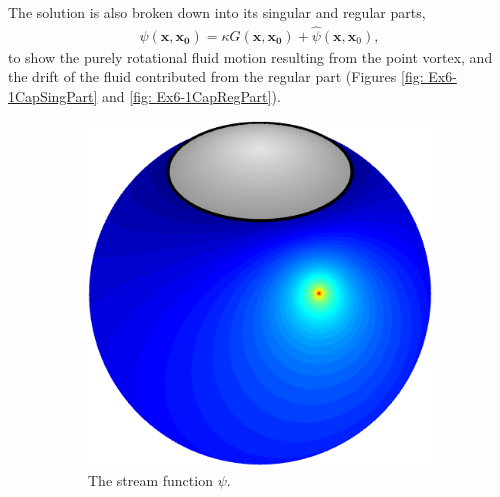 \documentclass{sfuthesis}
\begin{document}
The solution is also broken down into its singular and regular parts,
\begin{align*}
	\psi(\mathbf{x},\mathbf{x_0})=\kappa G(\mathbf{x},\mathbf{x_0})+\hat{\psi}(\mathbf{x}, \mathbf{x}_0), 
\end{align*}
to show the purely rotational fluid motion resulting from the point vortex, and the drift of the fluid contributed from the regular part (Figures \ref{fig: Ex6-1CapSingPart} and \ref{fig: Ex6-1CapRegPart}).

\begin{figure}[h]
        \centering
        \begin{subfigure}[b]{0.35\textwidth}
        		\includegraphics[width=\textwidth]{Ex6-1CapStreamFn}
			\caption{The stream function $\psi$.  \vspace{0.3cm}}
			\label{fig: Ex6-1CapStreamFn}
     	\end{subfigure} \hspace{1cm}
      	\begin{subfigure}[b]{0.35\textwidth}

\end{subfigure}
\end{figure}
\end{document}
